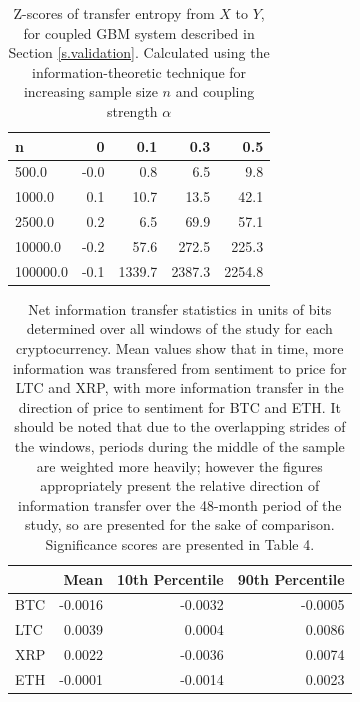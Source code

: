 \documentclass[]{rsos}%
\begin{document}
  
  \begin{table}[!htb]
    \label{t.table2}
    \caption{ Z-scores of transfer entropy from $X$ to $Y$, for coupled GBM system described in Section \ref{s.validation}. Calculated using the information-theoretic technique for increasing sample size $n$ and coupling strength $\alpha$}
    
      \begin{tabular}{lrrrr}

    n       &         0 &       0.1 &       0.3 &       0.5 \\
    \hline 
    500.0    & -0.0 &     0.8 &     6.5 &     9.8 \\
    1000.0   &  0.1 &    10.7 &    13.5 &    42.1 \\
    2500.0   &  0.2 &     6.5 &    69.9 &    57.1 \\
    10000.0  & -0.2 &    57.6 &   272.5 &   225.3 \\
    100000.0 & -0.1 &  1339.7 &  2387.3 &  2254.8 \\

    \end{tabular}
    
  \end{table}

  \begin{table}[!htb]
    \label{t.table3}
    \caption{ Net information transfer statistics in units of bits determined over all windows of the study for each cryptocurrency. Mean values show that in time, more information was transfered from sentiment to price for LTC and XRP, with more information transfer in the direction of price to sentiment for BTC and ETH. It should be noted that due to the overlapping strides of the windows, periods during the middle of the sample are weighted more heavily; however the figures appropriately present the relative direction of information transfer over the 48-month period of the study, so are presented for the sake of comparison. Significance scores are presented in Table {\color{blue}4}.}

    
    \begin{tabular}{lrrr}
     {} &    Mean &  10th Percentile &  90th Percentile \\
     \hline 
     BTC & -0.0016 &          -0.0032 &          -0.0005 \\
     LTC &  0.0039 &           0.0004 &           0.0086 \\
     XRP &  0.0022 &          -0.0036 &           0.0074 \\
     ETH & -0.0001 &          -0.0014 &           0.0023 \\
    \end{tabular}
  
  \end{table}
\end{document}
